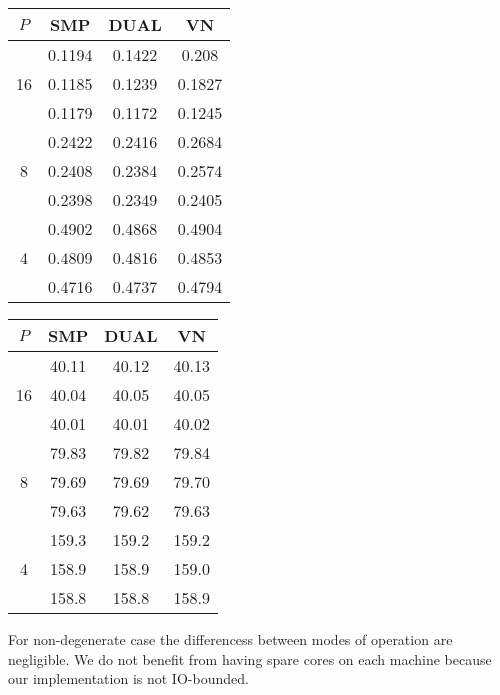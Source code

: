 \begin{minipage}[h]{0.47\textwidth}
\centering
\begin{tabular}{c|c|c|c|}
$P$ & SMP & DUAL & VN \\
\hline
 & 0.1194 & 0.1422 & 0.208 \\
16 & 0.1185 & 0.1239 & 0.1827 \\
 & 0.1179 & 0.1172 & 0.1245 \\
\hline
 & 0.2422 & 0.2416 & 0.2684 \\
8 & 0.2408 & 0.2384 & 0.2574 \\
 & 0.2398 & 0.2349 & 0.2405 \\
\hline
 & 0.4902 & 0.4868 & 0.4904 \\
4 & 0.4809 & 0.4816 & 0.4853 \\
 & 0.4716 & 0.4737 & 0.4794 \\
\hline
\end{tabular}
\end{minipage}
\hfill
\begin{minipage}[h]{0.47\textwidth}
\centering
\begin{tabular}{c|c|c|c|}
$P$ & SMP & DUAL & VN \\
\hline
 & 40.11 & 40.12 & 40.13 \\
16 & 40.04 & 40.05 & 40.05 \\
 & 40.01 & 40.01 & 40.02 \\
\hline
 & 79.83 & 79.82 & 79.84 \\
8 & 79.69 & 79.69 & 79.70 \\
 & 79.63 & 79.62 & 79.63 \\
\hline
 & 159.3 & 159.2 & 159.2 \\
4 & 158.9 & 158.9 & 159.0 \\
 & 158.8 & 158.8 & 158.9 \\
\hline
\end{tabular}
\end{minipage}
\vspace{1em}

For non-degenerate case the differencess between modes of operation are negligible.
We do not benefit from having spare cores on each machine because our implementation is not IO-bounded.

